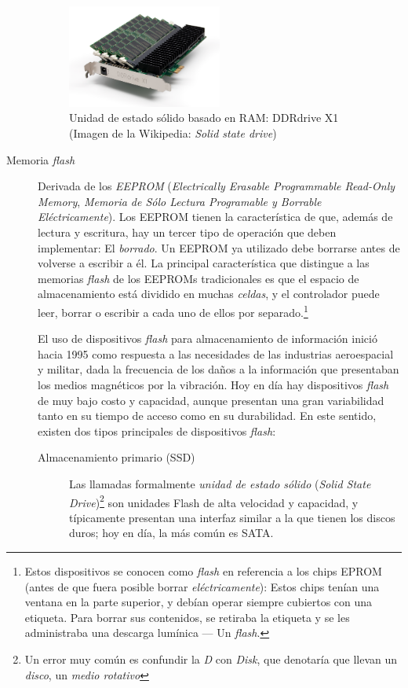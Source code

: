 \documentclass[11pt,fleqn]{book} %
\begin{document}
\begin{description}
	   \begin{figure}[htb]
	   \centering
	   \includegraphics[width=0.5\textwidth]{./img/estado_solido_ddr_drivex1.jpg}
	   \caption{Unidad de estado sólido basado en RAM: DDRdrive X1 (Imagen de la Wikipedia: \emph{Solid state drive})}
	   \end{figure}
\item[Memoria \emph{flash}] Derivada de los \emph{EEPROM} (\emph{Electrically Erasable      Programmable Read-Only Memory}, \emph{Memoria de Sólo Lectura      Programable y Borrable Eléctricamente}). Los EEPROM tienen la
     característica de que, además de lectura y escritura, hay un
     tercer tipo de operación que deben implementar: El \emph{borrado}. Un
     EEPROM ya utilizado debe borrarse antes de volverse a escribir a
     él. La principal característica que distingue a las memorias
     \emph{flash} de los EEPROMs tradicionales es que el espacio de
     almacenamiento está dividido en muchas \emph{celdas}, y el controlador
     puede leer, borrar o escribir a cada uno de ellos por
     separado.\footnote{Estos dispositivos se conocen como \emph{flash} en
     referencia a los chips EPROM (antes de que fuera posible borrar
     \emph{eléctricamente}): Estos chips tenían una ventana en la parte
     superior, y debían operar siempre cubiertos con una
     etiqueta. Para borrar sus contenidos, se retiraba la etiqueta y
     se les administraba una descarga lumínica — Un \emph{flash}. }

     El uso de dispositivos \emph{flash} para almacenamiento de información
     inició hacia 1995 como respuesta a las necesidades de las
     industrias aeroespacial y militar, dada la frecuencia de los
     daños a la información que presentaban los medios magnéticos por
     la vibración. Hoy en día hay dispositivos \emph{flash} de muy bajo
     costo y capacidad, aunque presentan una gran variabilidad tanto
     en su tiempo de acceso como en su durabilidad. En este sentido,
     existen dos tipos principales de dispositivos \emph{flash}:
\begin{description}
\item[Almacenamiento primario (SSD)] Las llamadas formalmente
       \emph{unidad de estado sólido} (\emph{Solid State Drive})\footnote{Un
       error muy común es confundir la \emph{D} con \emph{Disk}, que
       denotaría que llevan un \emph{disco}, un \emph{medio rotativo} } son
       unidades Flash de alta velocidad y capacidad, y típicamente
       presentan una interfaz similar a la que tienen los discos
       duros; hoy en día, la más común es SATA.


\end{description}
\end{description}
\end{document}
